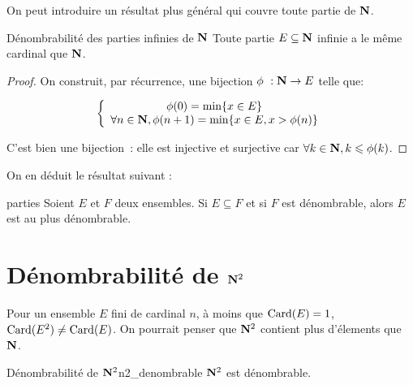 \documentclass[a4paper,french,final]{memoir}
\begin{document}
On peut introduire un résultat plus général qui couvre toute partie de $\mathbf{N}$.

\begin{theoremb}{Dénombrabilité des parties infinies de $\mathbf{N}$}{}
	Toute partie $E \subseteq \mathbf{N}$ infinie a le même cardinal que $\mathbf{N}$.
\end{theoremb}

\begin{proof}
	On construit, par récurrence, une bijection $\phi~: \NN \to E$ telle que:

	\[\left\lbrace \begin{array}{c}
	\phi(0) = \min \{x \in E\} \\
	\forall n \in \NN, \phi(n+1) = \min \{x \in E, x > \phi(n) \}
	\end{array} \right.\]

	C'est bien une bijection~: elle est injective et surjective car $\forall k \in \NN, k \leq \phi(k)$.
\end{proof}
On en déduit le résultat suivant :
\begin{theoremb}{}{parties}
	Soient $E$ et $F$ deux ensembles.
	Si $E \subseteq F$ et si $F$ est dénombrable, alors $E$ est au plus dénombrable.
\end{theoremb}
\section{\texorpdfstring{Dénombrabilité de $\mathbf{N}^2$}{Dénombrabilité de N²}}
Pour un ensemble $E$ fini de cardinal $n$, à moins que $\operatorname{Card}(E) = 1$, $\operatorname{Card}(E^2) \neq \operatorname{Card}(E)$. On pourrait penser que $\mathbf{N}^2 $ contient plus d'élements que $\mathbf{N}$.

\begin{theoremb}{Dénombrabilité de $\mathbf{N}^2$}{n2_denombrable}
	$\mathbf{N}^2$ est dénombrable.
\end{theoremb}
\end{document}

